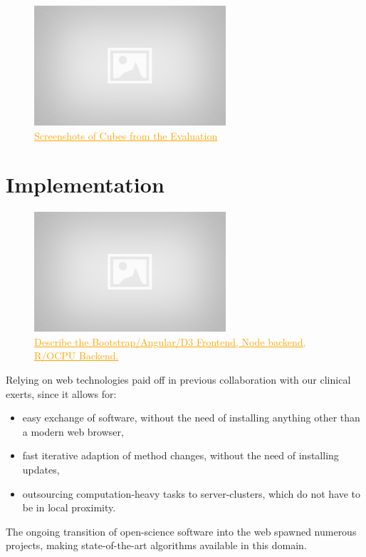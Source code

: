 \documentclass[journal]{style/vgtc} 			          %
\newcommand{\com}[1]{\textcolor{orange}{\uline{#1}}}
\begin{document}

\begin{figure}[htb]
 \centering
 \includegraphics[width=2.8in]{figures/placeholder}
 \caption{
 \com{Screenshots of Cubes from the Evaluation}
 }
  \label{fig:comparison}
\end{figure}

\section{Implementation} \label{implementation}
\begin{figure}[htb]
 \centering
 \includegraphics[width=2.8in]{figures/placeholder}
 \caption{
 \com{Describe the Bootstrap/Angular/D3 Frontend, Node backend, R/OCPU Backend.}
 }
  \label{fig:Implementation}
\end{figure}
Relying on web technologies paid off in previous collaboration with our clinical exerts, since it allows for:
\begin{itemize}
	\item easy exchange of software, without the need of installing anything other than a modern web browser,
	\item fast iterative adaption of method changes, without the need of installing updates,
	\item outsourcing computation-heavy tasks to server-clusters, which do not have to be in local proximity.
\end{itemize}
The ongoing transition of open-science software into the web spawned numerous projects, making state-of-the-art algorithms available in this domain.
\end{document}
